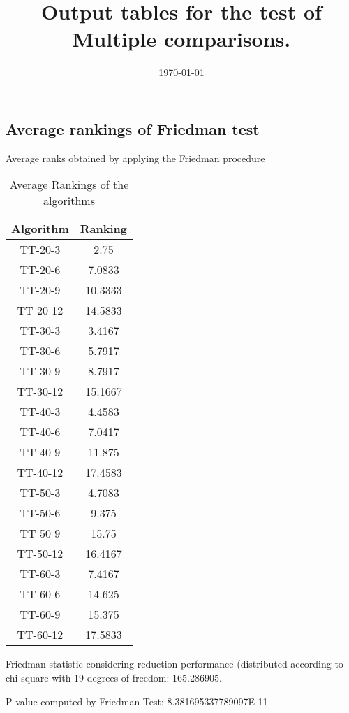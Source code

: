 \documentclass[a4paper,10pt]{article}
\title{Output tables for the test of Multiple comparisons.}
\author{}
\date{\today}
\begin{document}
\begin{landscape}
\pagestyle{empty}
\maketitle
\thispagestyle{empty}
\section{Average rankings of Friedman test}



Average ranks obtained by applying the Friedman procedure

\begin{table}[!htp]
\centering
\begin{tabular}{|c|c|}\hline
Algorithm&Ranking\\\hline
TT-20-3 & 2.75\\
TT-20-6 & 7.0833\\
TT-20-9 & 10.3333\\
TT-20-12 & 14.5833\\
TT-30-3 & 3.4167\\
TT-30-6 & 5.7917\\
TT-30-9 & 8.7917\\
TT-30-12 & 15.1667\\
TT-40-3 & 4.4583\\
TT-40-6 & 7.0417\\
TT-40-9 & 11.875\\
TT-40-12 & 17.4583\\
TT-50-3 & 4.7083\\
TT-50-6 & 9.375\\
TT-50-9 & 15.75\\
TT-50-12 & 16.4167\\
TT-60-3 & 7.4167\\
TT-60-6 & 14.625\\
TT-60-9 & 15.375\\
TT-60-12 & 17.5833\\
\hline
\end{tabular}
\caption{Average Rankings of the algorithms}
\end{table}

Friedman statistic considering reduction performance (distributed according to chi-square with 19 degrees of freedom: 165.286905.

P-value computed by Friedman Test: 8.381695337789097E-11.\newline




\end{landscape}
\end{document}
